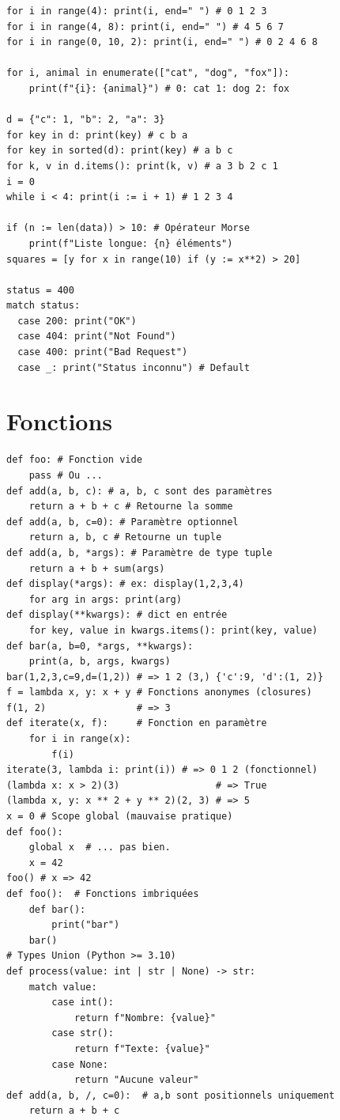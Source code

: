 \documentclass{article}
\begin{document}
\begin{multicols*}{4}
\begin{lstlisting}
for i in range(4): print(i, end=" ") # 0 1 2 3
for i in range(4, 8): print(i, end=" ") # 4 5 6 7
for i in range(0, 10, 2): print(i, end=" ") # 0 2 4 6 8

for i, animal in enumerate(["cat", "dog", "fox"]):
    print(f"{i}: {animal}") # 0: cat 1: dog 2: fox

d = {"c": 1, "b": 2, "a": 3}
for key in d: print(key) # c b a
for key in sorted(d): print(key) # a b c
for k, v in d.items(): print(k, v) # a 3 b 2 c 1
i = 0
while i < 4: print(i := i + 1) # 1 2 3 4

if (n := len(data)) > 10: # Opérateur Morse
    print(f"Liste longue: {n} éléments")
squares = [y for x in range(10) if (y := x**2) > 20]

status = 400
match status:
  case 200: print("OK")
  case 404: print("Not Found")
  case 400: print("Bad Request")
  case _: print("Status inconnu") # Default
\end{lstlisting}

\section*{Fonctions}
\begin{lstlisting}
def foo: # Fonction vide
    pass # Ou ...
def add(a, b, c): # a, b, c sont des paramètres
    return a + b + c # Retourne la somme
def add(a, b, c=0): # Paramètre optionnel
    return a, b, c # Retourne un tuple
def add(a, b, *args): # Paramètre de type tuple
    return a + b + sum(args)
def display(*args): # ex: display(1,2,3,4)
    for arg in args: print(arg)
def display(**kwargs): # dict en entrée
    for key, value in kwargs.items(): print(key, value)
def bar(a, b=0, *args, **kwargs):
    print(a, b, args, kwargs)
bar(1,2,3,c=9,d=(1,2)) # => 1 2 (3,) {'c':9, 'd':(1, 2)}
f = lambda x, y: x + y # Fonctions anonymes (closures)
f(1, 2)                # => 3
def iterate(x, f):     # Fonction en paramètre
    for i in range(x):
        f(i)
iterate(3, lambda i: print(i)) # => 0 1 2 (fonctionnel)
(lambda x: x > 2)(3)                 # => True
(lambda x, y: x ** 2 + y ** 2)(2, 3) # => 5
x = 0 # Scope global (mauvaise pratique)
def foo():
    global x  # ... pas bien.
    x = 42
foo() # x => 42
def foo():  # Fonctions imbriquées
    def bar():
        print("bar")
    bar()
# Types Union (Python >= 3.10)
def process(value: int | str | None) -> str:
    match value:
        case int():
            return f"Nombre: {value}"
        case str():
            return f"Texte: {value}"
        case None:
            return "Aucune valeur"
def add(a, b, /, c=0):  # a,b sont positionnels uniquement
    return a + b + c
\end{lstlisting}


\end{multicols*}
\end{document}
